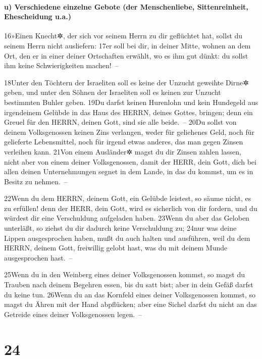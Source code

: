 \hypertarget{u-verschiedene-einzelne-gebote-der-menschenliebe-sittenreinheit-ehescheidung-u.a.}{%
\paragraph{u) Verschiedene einzelne Gebote (der Menschenliebe,
Sittenreinheit, Ehescheidung
u.a.)}\label{u-verschiedene-einzelne-gebote-der-menschenliebe-sittenreinheit-ehescheidung-u.a.}}

16»Einen Knecht✲, der sich vor seinem Herrn zu dir geflüchtet hat,
sollst du seinem Herrn nicht ausliefern: 17er soll bei dir, in deiner
Mitte, wohnen an dem Ort, den er in einer deiner Ortschaften erwählt, wo
es ihm gut dünkt: du sollst ihm keine Schwierigkeiten machen!~--

18Unter den Töchtern der Israeliten soll es keine der Unzucht geweihte
Dirne✲ geben, und unter den Söhnen der Israeliten soll es keinen zur
Unzucht bestimmten Buhler geben. 19Du darfst keinen Hurenlohn und kein
Hundegeld aus irgendeinem Gelübde in das Haus des HERRN, deines Gottes,
bringen; denn ein Greuel für den HERRN, deinen Gott, sind sie alle
beide.~-- 20Du sollst von deinem Volksgenossen keinen Zins verlangen,
weder für geliehenes Geld, noch für gelieferte Lebensmittel, noch für
irgend etwas anderes, das man gegen Zinsen verleihen kann. 21Von einem
Ausländer✲ magst du dir Zinsen zahlen lassen, nicht aber von einem
deiner Volksgenossen, damit der HERR, dein Gott, dich bei allen deinen
Unternehmungen segnet in dem Lande, in das du kommst, um es in Besitz zu
nehmen.~--

22Wenn du dem HERRN, deinem Gott, ein Gelübde leistest, so säume nicht,
es zu erfüllen! denn der HERR, dein Gott, wird es sicherlich von dir
fordern, und du würdest dir eine Verschuldung aufgeladen haben. 23Wenn
du aber das Geloben unterläßt, so ziehst du dir dadurch keine
Verschuldung zu; 24nur was deine Lippen ausgesprochen haben, mußt du
auch halten und ausführen, weil du dem HERRN, deinem Gott, freiwillig
gelobt hast, was du mit deinem Munde ausgesprochen hast.~--

25Wenn du in den Weinberg eines deiner Volksgenossen kommst, so magst du
Trauben nach deinem Begehren essen, bis du satt bist; aber in dein Gefäß
darfst du keine tun. 26Wenn du an das Kornfeld eines deiner
Volksgenossen kommst, so magst du Ähren mit der Hand abpflücken; aber
eine Sichel darfst du nicht an das Getreide eines deiner Volksgenossen
legen.~--

\hypertarget{section-23}{%
\section{24}\label{section-23}}

